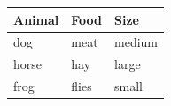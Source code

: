 \documentclass{article}
\begin{document}
\begin{tabular}{lll}
\toprule
Animal & Food & Size \\
\midrule
dog & meat & medium \\
horse & hay & large \\
frog & flies & small \\
\bottomrule
\end{tabular}
\end{document}
